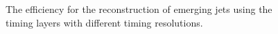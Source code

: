 \begin{figure}
\begin{center}

\end{center}
\caption{
The efficiency for the reconstruction of emerging jets using the timing layers with different timing resolutions. 
}
\label{fig:efficiency}
\end{figure}

